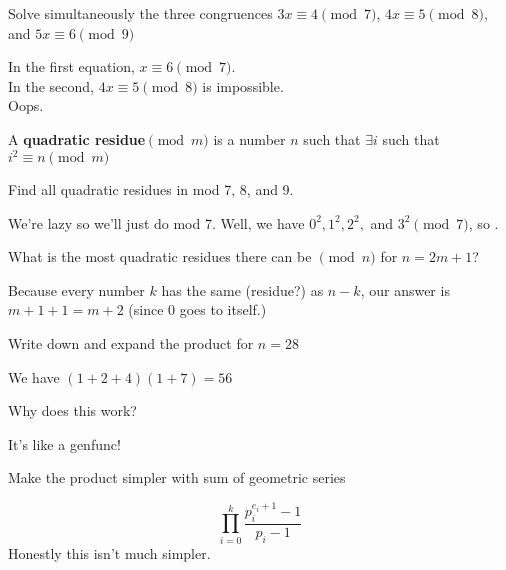 \documentclass{scrartcl}
\begin{document}
\begin{exercise}
	Solve simultaneously the three congruences $3x \equiv 4 \pmod{7}$, $4x \equiv 5 \pmod{8}$, and $5x \equiv 6 \pmod {9}$
	\begin{soln}
		In the first equation, $x \equiv 6 \pmod{7}$. \\
		In the second, $4x \equiv 5 \pmod{8}$ is impossible.\\
		Oops.
	\end{soln}
\end{exercise}

\begin{definition*}
	A \textbf{quadratic residue}$\pmod{m}$ is a number $n$ such that $\exists i$ such that $i^2 \equiv n \pmod{m}$
\end{definition*}

\begin{exercise}
Find all quadratic residues in mod 7, 8, and 9.
	\begin{soln}
		We're lazy so we'll just do mod 7.
		Well, we have $0^2, 1^2, 2^2,$ and $3^2 \pmod{7}$, so .
	\end{soln}
\end{exercise}

\begin{exercise}
	What is the most quadratic residues there can be $\pmod{n}$ for $n=2m+1$?
	\begin{soln}
		Because every number $k$ has the same (residue?) as $n - k$, our answer is $m+1 + 1 = \boxed{m+2}$ (since 0 goes to itself.)
	\end{soln}
\end{exercise}

\setcounter{exercise}{9}

\begin{exercise}
	Write down and expand the product for $n=28$
	\begin{soln}
		We have $(1 + 2 + 4)(1 + 7) = 56$
	\end{soln}
\end{exercise}

\begin{exercise}
	Why does this work?
	\begin{soln}
		It's like a genfunc!
	\end{soln}
\end{exercise}

\begin{exercise}
	Make the product simpler with sum of geometric series
	\begin{soln}
		\[\prod_{i = 0}^k \frac{p_i^{e_i + 1}-1}{p_i - 1}\]
		Honestly this isn't much simpler.
	\end{soln}
\end{exercise}
\end{document}
